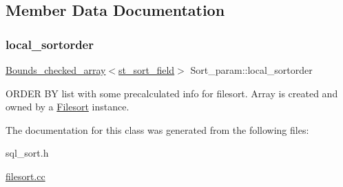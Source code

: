 \subsection{Member Data Documentation}
\mbox{\label{classSort__param_a296009bb82bee97d6bc9d24b1114e849}} 
\subsubsection{\texorpdfstring{local\+\_\+sortorder}{local\_sortorder}}
{\footnotesize\ttfamily \mbox{\hyperlink{classBounds__checked__array}{Bounds\+\_\+checked\+\_\+array}}$<$\mbox{\hyperlink{structst__sort__field}{st\+\_\+sort\+\_\+field}}$>$ Sort\+\_\+param\+::local\+\_\+sortorder}

O\+R\+D\+ER BY list with some precalculated info for filesort. Array is created and owned by a \mbox{\hyperlink{classFilesort}{Filesort}} instance. 

The documentation for this class was generated from the following files\+:\begin{DoxyCompactItemize}
\item 
sql\+\_\+sort.\+h\item 
\mbox{\hyperlink{filesort_8cc}{filesort.\+cc}}\end{DoxyCompactItemize}
